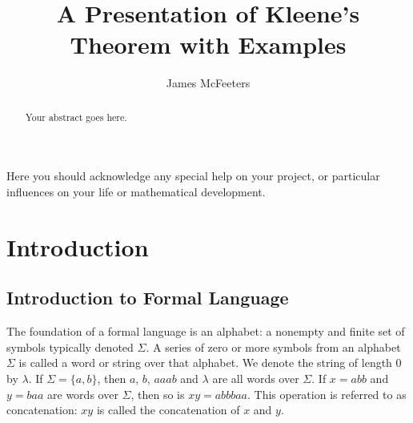 \documentclass{bcthesis}
\title{A Presentation of Kleene's Theorem with Examples}
\author{James McFeeters}
\begin{document}
\setlength{\parskip}{0.5 em}

\frontmatter

\maketitle

\begin{abstract}
	Your abstract goes here.
\end{abstract}



\begin{acknowledgments}
	Here you should acknowledge any special help on your project, or particular influences on your life or mathematical development.
\end{acknowledgments}


\tableofcontents


\mainmatter

\chapter{Introduction}%
\label{ch:introduction}

	\section{Introduction to Formal Language} %
	\label{sec:introduction_to_formal_language}
		The foundation of a formal language is an alphabet: a nonempty and finite set of symbols typically denoted $\Sigma$.
		A series of zero or more symbols from an alphabet $\Sigma$ is called a word or string over that alphabet.
		We denote the string of length $0$ by $\lambda$.
		If $\Sigma = \{ a, b \}$, then $a$, $b$, $aaab$ and $\lambda$ are all words over $\Sigma$.
		If $x = abb$ and $y = baa$ are words over $\Sigma$, then so is $xy = abbbaa$.
		This operation is referred to as concatenation: $xy$ is called the concatenation of $x$ and $y$. \cite[pg.~1]{salomaa}
\end{document}
